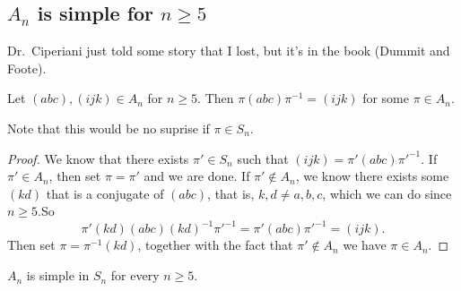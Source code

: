 \subsection{$A_n$ is simple for $n\geq 5$}
Dr.\ Ciperiani just told some story that I lost, but it's in the book (Dummit and Foote).
\begin{lemma}
    Let $(abc),(ijk)\in A_n$ for $n\geq 5$. Then $\pi(abc)\pi^{-1}=(ijk)$ for some $\pi\in A_n.$ 
\end{lemma}
Note that this would be no suprise if $\pi\in S_n$.
\begin{proof}
    We know that there exists  $\pi'\in S_n$ such that $(ijk)=\pi'(abc)\pi'^{-1}$. If $\pi'\in A_n$, then set $\pi=\pi'$ and we are done. If $\pi'\notin A_n$, we know there exists some $(kd)$ that is a conjugate of $(abc)$, that is, $k,d\neq a,b,c$, which we can do since $n\geq 5$.So \[
        \pi'(kd)(abc)(kd)^{-1}\pi'^{-1}=\pi'(abc)\pi'^{-1}=(ijk).
    \] Then set $\pi=\pi^{-1}(kd)$, together with the fact that $\pi'\notin A_n$ we have $\pi\in A_n$.
\end{proof}
\begin{theorem}
    $A_n$ is simple in $S_n$ for every $n\geq 5$.
\end{theorem}
